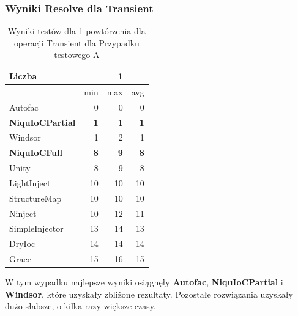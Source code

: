 \documentclass[12pt]{article}
\begin{document}
\subsubsection{Wyniki Resolve dla Transient}
\begin{table}[H]
\captionsetup{belowskip=0pt,aboveskip=0pt}
\begin{center}
\begin{small}
	\begin{tabular}{ | l | r r r | }
    		\hline
Liczba & & 1 & \\ \hline
 & min & max & avg \\ \hline
Autofac & 0 & 0 & 0 \\ \hline
\textbf{NiquIoCPartial} & \textbf{1} & \textbf{1} & \textbf{1} \\ \hline
Windsor & 1 & 2 & 1 \\ \hline
\textbf{NiquIoCFull} & \textbf{8} & \textbf{9} & \textbf{8} \\ \hline
Unity & 8 & 9 & 8 \\ \hline
LightInject & 10 & 10 & 10 \\ \hline
StructureMap & 10 & 10 & 10 \\ \hline
Ninject & 10 & 12 & 11 \\ \hline
SimpleInjector & 13 & 14 & 13 \\ \hline
DryIoc & 14 & 14 & 14 \\ \hline
Grace & 15 & 16 & 15 \\ \hline
  	\end{tabular}
\end{small}
\end{center}
\caption{Wyniki testów dla 1 powtórzenia dla operacji Transient dla Przypadku testowego A}
\label{TestCaseA_Transient1}
\end{table}
W tym wypadku najlepsze wyniki osiągnęły \textbf{Autofac}, \textbf{NiquIoCPartial} i \textbf{Windsor}, które uzyskały zbliżone rezultaty. Pozostałe rozwiązania uzyskały dużo słabsze, o kilka razy większe czasy.
\\ \\
\end{document}
